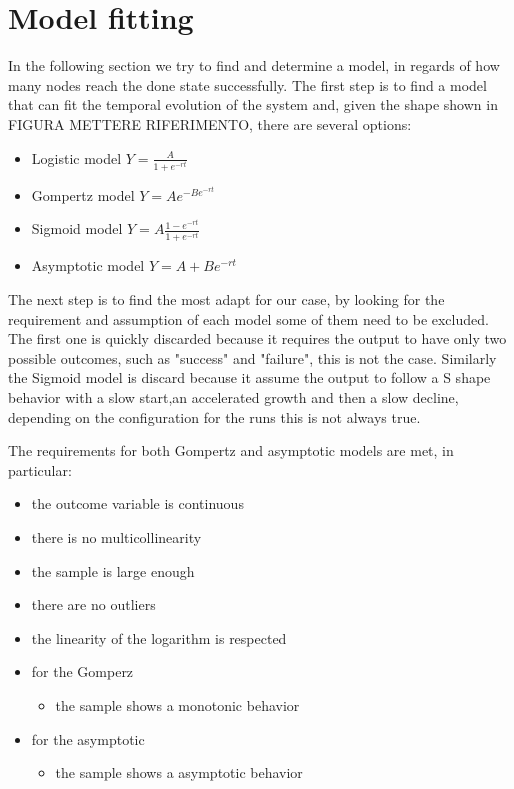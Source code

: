 \section{Model fitting} \label{sec:ModelFitting}
In the following section we try to find and determine a model, in regards of how many nodes reach the done state successfully. The first step is to find a model that can fit the temporal evolution of the system and, given the shape shown in FIGURA METTERE RIFERIMENTO, there are several options:

\begin{itemize}
	\item Logistic model $ Y = \frac{A}{1 + e^{-rt}} $
	\item Gompertz model $ Y = Ae^{-Be^{-rt}} $
	\item Sigmoid model $ Y = A\frac{1-e^{-rt}}{1+e^{-rt}}$
	\item Asymptotic model $ Y = A + Be^{-rt}$
\end{itemize} 

The next step is to find the most adapt for our case, by looking for the requirement and assumption of each model some of them need to be excluded. The first one is quickly discarded because it requires the output to have only two possible outcomes, such as "success" and "failure", this is not the case.
Similarly the Sigmoid model is discard because it assume the output to follow a S shape behavior with a slow start,an accelerated growth and then a slow decline, depending on the configuration for the runs this is not always true.


The requirements for both Gompertz and asymptotic models are met, in particular:
\begin{itemize}
	\item the outcome variable is continuous
	\item there is no multicollinearity
	\item the sample is large enough
	\item there are no outliers
	\item the linearity of the logarithm is respected
	
	\item for the Gomperz
		\begin{itemize}
			\item the sample shows a monotonic behavior
		\end{itemize}
		\item for the asymptotic
		\begin{itemize}
			\item the sample shows a asymptotic behavior
		\end{itemize}
\end{itemize}

